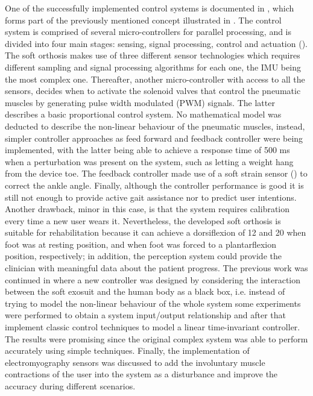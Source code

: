 One of the successfully implemented control systems is documented in \cite{park2011bio}, which forms part of the previously mentioned concept illustrated in . The control system is comprised of several micro-controllers for parallel processing, and is divided into four main stages: sensing, signal processing, control and actuation (). The soft orthosis makes use of three different sensor technologies which requires different sampling and signal processing algorithms for each one, the IMU being the most complex one. Thereafter, another micro-controller with access to all the sensors, decides when to activate the solenoid valves that control the pneumatic muscles by generating pulse width modulated (PWM) signals. The latter describes a basic proportional control system. No mathematical model was deducted to describe the non-linear behaviour of the pneumatic muscles, instead, simpler controller approaches as feed forward and feedback controller were being implemented, with the latter being able to achieve a response time of 500 ms when a perturbation was present on the system, such as letting a weight hang from the device toe. The feedback controller made use of a soft strain sensor () to correct the ankle angle. Finally, although the controller performance is good it is still not enough to provide active gait assistance nor to predict user intentions. Another drawback, minor in this case, is that the system requires calibration every time a new user wears it. Nevertheless, the developed soft orthosis is suitable for rehabilitation because it can achieve a dorsiflexion of 12\textdegree{} and 20\textdegree{} when foot was at resting position, and when foot was forced to a plantarflexion position, respectively; in addition, the perception system could provide the clinician with meaningful data about the patient progress. The previous work was continued in \cite{park2014design} where a new controller was designed by considering the interaction between the soft exosuit and the human body as a black box, i.e. instead of trying to model the non-linear behaviour of the whole system some experiments were performed to obtain a system input/output relationship and after that implement classic control techniques to model a linear time-invariant controller. The results were promising since the original complex system was able to perform accurately using simple techniques. Finally, the implementation of electromyography sensors was discussed to add the involuntary muscle contractions of the user into the system as a disturbance and improve the accuracy during different scenarios.

